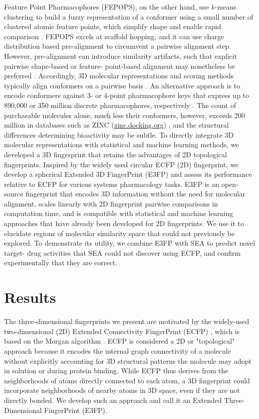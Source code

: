 \documentclass[../main.tex]{subfiles}
\begin{document}
\begin{refsection}
Feature Point Pharmacophores (FEPOPS), on the other hand, use $k$-means clustering to build a fuzzy representation of a conformer using a small number of clustered atomic feature points, which simplify shape and enable rapid comparison \cite{jenkins_2004,jenkins_2013}.
FEPOPS excels at scaffold hopping, and it can use charge distribution based pre-alignment to circumvent a pairwise alignment step.
However, pre-alignment can introduce similarity artifacts, such that explicit pairwise shape-based or feature- point-based alignment may nonetheless be preferred \cite{jenkins_2004}.
Accordingly, 3D molecular representations and scoring methods typically align conformers on a pairwise basis \cite{nicholls_2010,sheridan_2002}.
An alternative approach is to encode conformers against 3- or 4-point pharmacophore keys that express up to 890,000 or 350 million discrete pharmacophores, respectively \cite{mason_1999,pickett_1996}.
The count of purchasable molecules alone, much less their conformers, however, exceeds 200 million in databases such as ZINC (\url{zinc.docking.org}) \cite{sterling_2015}, and the structural differences determining bioactivity may be subtle.
To directly integrate 3D molecular representations with statistical and machine learning methods, we developed a 3D fingerprint that retains the advantages of 2D topological fingerprints.
Inspired by the widely used circular ECFP (2D) fingerprint, we develop a spherical Extended 3D FingerPrint (E3FP) and assess its performance relative to ECFP for various systems pharmacology tasks.
E3FP is an open-source fingerprint that encodes 3D information without the need for molecular alignment, scales linearly with 2D fingerprint pairwise comparisons in computation time, and is compatible with statistical and machine learning approaches that have already been developed for 2D fingerprints.
We use it to elucidate regions of molecular similarity space that could not previously be explored.
To demonstrate its utility, we combine E3FP with SEA to predict novel target- drug activities that SEA could not discover using ECFP, and confirm experimentally that they are correct.

\section{Results}\label{sec:results}

The three-dimensional fingerprints we present are motivated by the widely-used two-dimensional (2D) Extended Connectivity FingerPrint  (ECFP) \cite{rogers_2010}, which is based on the Morgan algorithm  \cite{morgan_1965}.
ECFP is considered a 2D or "topological" approach because it encodes the internal graph connectivity of a molecule without explicitly accounting for 3D structural patterns the molecule may adopt in solution or during protein binding.
While ECFP thus derives from the neighborhoods of atoms directly connected to each atom, a 3D fingerprint could incorporate neighborhoods of nearby atoms in 3D space, even if they are not directly bonded.
We develop such an approach and call it an Extended Three-Dimensional FingerPrint (E3FP).


\end{refsection}
\end{document}
